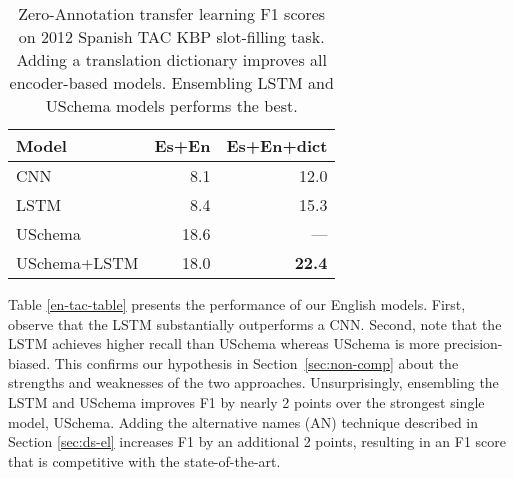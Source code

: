 \begin{table}[h!]

\begin{center}
\caption{Zero-Annotation transfer learning F1 scores on 2012 Spanish TAC KBP slot-filling task. Adding a translation dictionary improves all encoder-based models. Ensembling LSTM and USchema models performs the best. \label{es-tac-table}}
\begin{tabular}{|lrr|}
\hline
\bf Model & \bf Es+En & \bf Es+En+dict  \\
\hline\hline
CNN 		                    & 8.1     & 12.0	\\
LSTM 	                        & 8.4     & 15.3   \\
USchema                         & 18.6     & --- \\
\hline
USchema+LSTM                    & 18.0     & \bf 22.4 \\
\hline
\end{tabular}
\end{center}
\end{table}




Table \ref{en-tac-table} presents the performance of our English models. First, observe that the LSTM substantially outperforms a CNN. Second, note that the LSTM achieves higher recall than USchema whereas USchema is more precision-biased. This confirms our hypothesis in Section~\ref{sec:non-comp} about the strengths and weaknesses of the two approaches. 
Unsurprisingly, ensembling the LSTM and USchema improves F1 by nearly 2 points over the strongest single model, USchema. Adding the alternative names (AN) technique described in Section \ref{sec:ds-el} increases F1 by an additional 2 points, resulting in an F1 score that is competitive with the state-of-the-art.

